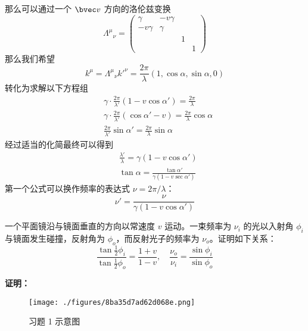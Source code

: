 那么可以通过一个 $\bvec v$ 方向的洛伦兹变换
\begin{equation}
\Lambda^\mu{}_\nu=\begin{pmatrix}
\gamma & -v\gamma &  & \\
-v\gamma & \gamma &  & \\
& & 1 & \\
& & & 1
\end{pmatrix}
\end{equation}
那么我们希望
\begin{equation}
k^\mu = \Lambda^\mu{}_\nu k'^\nu = \frac{2\pi}{\lambda}(1,\cos\alpha,\sin\alpha,0)
\end{equation}
转化为求解以下方程组
\begin{equation}
\begin{aligned}
& \gamma\cdot\frac{2\pi}{\lambda'}\left(1-v\cos\alpha'\right)=\frac{2\pi}{\lambda}\\
& \gamma\cdot\frac{2\pi}{\lambda'}\left(\cos\alpha'-v\right)=\frac{2\pi}{\lambda}\cos\alpha\\
& \frac{2\pi}{\lambda'}\sin\alpha' = \frac{2\pi }{\lambda}\sin\alpha
\end{aligned}
\end{equation}
经过适当的化简最终可以得到
\begin{equation}
\begin{aligned}
&\frac{\lambda'}{\lambda}=\gamma(1-v\cos\alpha')\\
&\tan\alpha=\frac{\tan\alpha'}{\gamma(1-v\sec \alpha')}
\end{aligned}
\end{equation}
第一个公式可以换作频率的表达式 $\nu=2\pi/\lambda$：
\begin{equation}
\nu'=\frac{\nu}{\gamma(1-v\cos\alpha')}
\end{equation}

\begin{exercise}{}
一个平面镜沿与镜面垂直的方向以常速度 $v$ 运动。一束频率为 $\nu_i$ 的光以入射角 $\phi_i$ 与镜面发生碰撞，反射角为 $\phi_o$，而反射光子的频率为 $\nu_o$。证明如下关系：
\begin{equation}
	\frac{\tan\frac{1}{2}\phi_i}{\tan\frac{1}{2}\phi_o}=\frac{1+v}{1-v},\quad \frac{\nu_o}{\nu_i}=\frac{\sin\phi_i}{\sin\phi_o}
\end{equation}
\end{exercise}
\textbf{证明：}
\begin{figure}[ht]
\centering
\texttt{[image: ./figures/8ba35d7ad62d068e.png]}
\caption{习题 1 示意图} \label{fig_SRkmls_1}
\end{figure}

